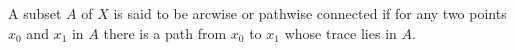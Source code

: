 A subset $A$ of $X$ is said to be arcwise or pathwise connected if for any two points $x_0$ and $x_1$ in $A$ there is a path from $x_0$ to $x_1$ whose trace lies in $A$.
